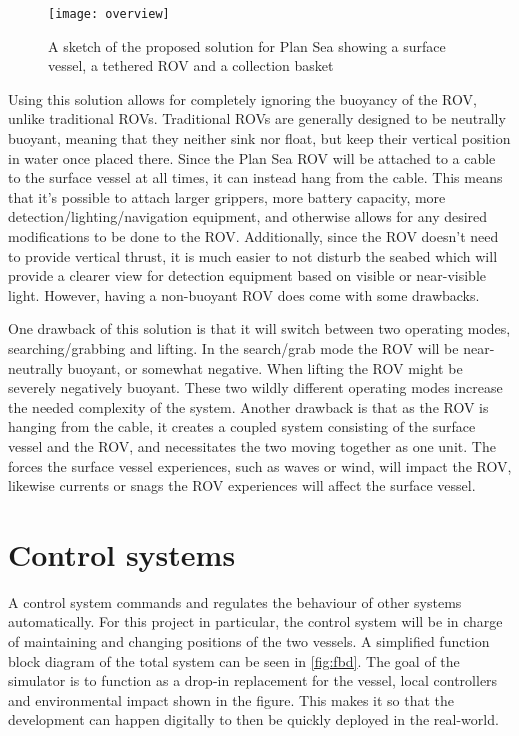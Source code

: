 \begin{figure}
	\centering
	\texttt{[image: overview]}
	\caption{A sketch of the proposed solution for Plan Sea showing a surface vessel, a tethered ROV and a collection basket}
	\label{fig:overview}
\end{figure}

Using this solution allows for completely ignoring the buoyancy of the ROV, unlike traditional ROVs. Traditional ROVs are generally designed to be neutrally buoyant, meaning that they neither sink nor float, but keep their vertical position in water once placed there. Since the Plan Sea ROV will be attached to a cable to the surface vessel at all times, it can instead hang from the cable. This means that it's possible to attach larger grippers, more battery capacity, more detection/lighting/navigation equipment, and otherwise allows for any desired modifications to be done to the ROV. Additionally, since the ROV doesn't need to provide vertical thrust, it is much easier to not disturb the seabed which will provide a clearer view for detection equipment based on visible or near-visible light. However, having a non-buoyant ROV does come with some drawbacks.

One drawback of this solution is that it will switch between two operating modes, searching/grabbing and lifting. In the search/grab mode the ROV will be near-neutrally buoyant, or somewhat negative. When lifting the ROV might be severely negatively buoyant. These two wildly different operating modes increase the needed complexity of the system. Another drawback is that as the ROV is hanging from the cable, it creates a coupled system consisting of the surface vessel and the ROV, and necessitates the two moving together as one unit. The forces the surface vessel experiences, such as waves or wind, will impact the ROV, likewise currents or snags the ROV experiences will affect the surface vessel.

\section{Control systems}
A control system commands and regulates the behaviour of other systems automatically. For this project in particular, the control system will be in charge of maintaining and changing positions of the two vessels. A simplified function block diagram of the total system can be seen in \cref{fig:fbd}. The goal of the simulator is to function as a drop-in replacement for the vessel, local controllers and environmental impact shown in the figure. This makes it so that the development can happen digitally to then be quickly deployed in the real-world.

